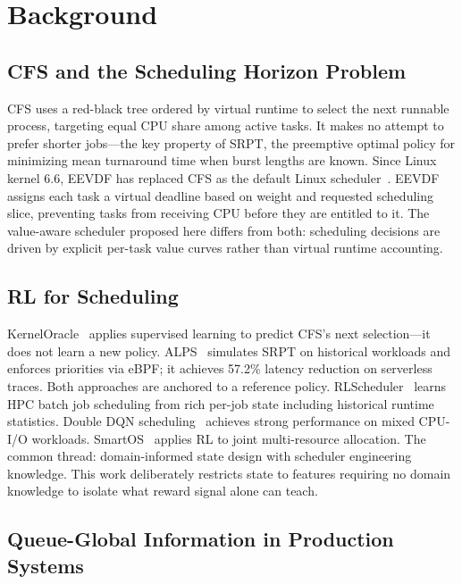 \documentclass[10pt,twocolumn]{article}
\theoremstyle{remark}
\begin{document}
\section{Background}

\subsection{CFS and the Scheduling Horizon Problem}

CFS uses a red-black tree ordered by virtual runtime to select the
next runnable process, targeting equal CPU share among active tasks.
It makes no attempt to prefer shorter jobs---the key property of SRPT,
the preemptive optimal policy for minimizing mean turnaround time when
burst lengths are known. Since Linux kernel 6.6, EEVDF has replaced
CFS as the default Linux scheduler~\cite{eevdf}. EEVDF assigns each
task a virtual deadline based on weight and requested scheduling slice,
preventing tasks from receiving CPU before they are entitled to it.
The value-aware scheduler proposed here differs from both: scheduling
decisions are driven by explicit per-task value curves rather than
virtual runtime accounting.

\subsection{RL for Scheduling}

KernelOracle~\cite{kernelOracle} applies supervised learning to
predict CFS's next selection---it does not learn a new policy.
ALPS~\cite{alps} simulates SRPT on historical workloads and enforces
priorities via eBPF; it achieves 57.2\% latency reduction on
serverless traces. Both approaches are anchored to a reference policy.
RLScheduler~\cite{rlscheduler} learns HPC batch job scheduling from
rich per-job state including historical runtime statistics.
Double DQN scheduling~\cite{doubleDQN} achieves strong performance on
mixed CPU-I/O workloads. SmartOS~\cite{smartOS} applies RL to joint
multi-resource allocation. The common thread: domain-informed state
design with scheduler engineering knowledge. This work deliberately
restricts state to features requiring no domain knowledge to isolate
what reward signal alone can teach.

\subsection{Queue-Global Information in Production Systems}
\end{document}
